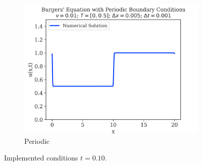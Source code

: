 \begin{figure}
\begin{subfigure}{0.55\linewidth}
		\includegraphics[width=\linewidth]{../periodic_BC/images_nu=0.01/100_plot}
		\caption{Periodic}
	\end{subfigure}

	\caption{Implemented conditions $t=0.10$.}
	\label{fig:0.1-figures}
\end{figure}

